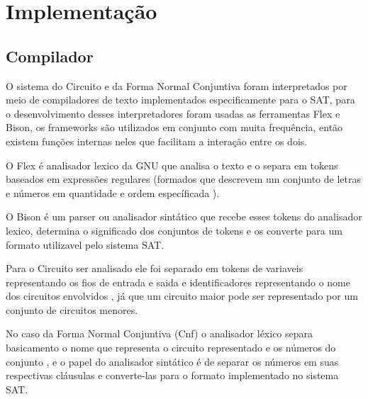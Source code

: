 \section{Implementação}
\label{sec:implementacao}


\subsection{Compilador}
\label{sec:Compilador}


			O sistema do Circuito e da Forma Normal Conjuntiva foram interpretados por meio de compiladores de texto implementados especificamente para o SAT, para o desenvolvimento desses interpretadores foram usadas as ferramentas Flex e Bison, os frameworks são utilizados em conjunto com muita frequência, então existem funções internas neles que facilitam a interação entre os dois.
			
		O Flex é analisador lexico da GNU que analisa o texto e o separa em tokens baseados em expressões regulares (formados que descrevem um conjunto de letras e números em quantidade e ordem específicada ).
		
			O Bison é um parser ou analisador sintático que recebe esses tokens do analisador lexico, determina o significado dos conjuntos de tokens e os converte para um formato utilizavel pelo sistema SAT.
	
			Para o Circuito ser analisado ele foi separado em tokens de variaveis representando os fios de entrada e saida e identificadores representando o nome dos circuitos envolvidos , já que um circuito maior pode ser representado por um conjunto de circuitos menores.

			No caso da Forma Normal Conjuntiva (Cnf) o analisador léxico separa basicamento o nome que representa o circuito representado e os números do conjunto , e o papel do analisador sintático é de separar os números em suas respectivas cláusulas e converte-las para o formato implementado no sistema SAT.

